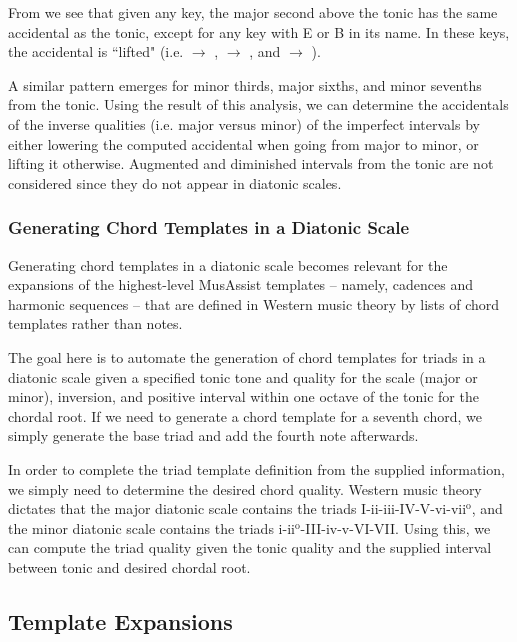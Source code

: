 \documentclass{article}
\begin{document}
From  we see that given any key, the major second above the tonic has the same accidental as the tonic, except for any key with E or B in its name. In these keys, the accidental is ``lifted"  (i.e. \musFlat $\rightarrow$ \musNatural, \musNatural $\rightarrow$ \musSharp, and \musSharp $\rightarrow$ \musDoubleSharp).

A similar pattern emerges for minor thirds, major sixths, and minor sevenths from the tonic. Using the result of this analysis, we can determine the accidentals of the inverse qualities (i.e. major versus minor) of the imperfect intervals by either lowering the computed accidental when going from major to minor, or lifting it otherwise. Augmented and diminished intervals from the tonic are not considered since they do not appear in diatonic scales.

\subsubsection{Generating Chord Templates in a Diatonic Scale}
\label{sec:chord_generate}
Generating chord templates in a diatonic scale becomes relevant for the expansions of the highest-level MusAssist templates – namely, cadences and harmonic sequences – that are defined in Western music theory by lists of chord templates rather than notes. 

The goal here is to automate the generation of chord templates for triads in a diatonic scale given a specified tonic tone and quality for the scale (major or minor), inversion, and positive interval within one octave of the tonic for the chordal root. If we need to generate a chord template for a seventh chord, we simply generate the base triad and add the fourth note afterwards. 

In order to complete the triad template definition from the supplied information, we simply need to determine the desired chord quality. Western music theory dictates that the major diatonic scale contains the triads I-ii-iii-IV-V-vi-vii$^\text{o}$, and the minor diatonic scale contains the triads i-ii$^\text{o}$-III-iv-v-VI-VII. Using this, we can compute the triad quality given the tonic quality and the supplied interval between tonic and desired chordal root.

\subsection{Template Expansions}
\end{document}
